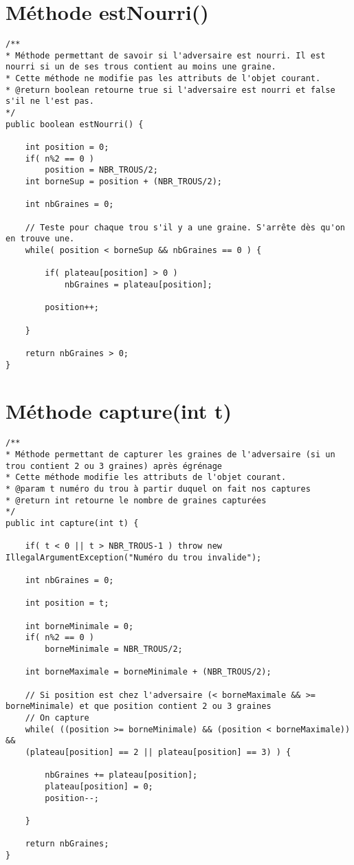 \documentclass[11pt,a4paper]{report}
\begin{document}
\newpage

\section{Méthode estNourri()}
\begin{lstlisting}
/**
* Méthode permettant de savoir si l'adversaire est nourri. Il est nourri si un de ses trous contient au moins une graine.
* Cette méthode ne modifie pas les attributs de l'objet courant.
* @return boolean retourne true si l'adversaire est nourri et false s'il ne l'est pas.
*/
public boolean estNourri() {

    int position = 0;
    if( n%2 == 0 ) 
        position = NBR_TROUS/2;
    int borneSup = position + (NBR_TROUS/2);

    int nbGraines = 0;

    // Teste pour chaque trou s'il y a une graine. S'arrête dès qu'on en trouve une.
    while( position < borneSup && nbGraines == 0 ) {

        if( plateau[position] > 0 )
            nbGraines = plateau[position];

        position++;

    }

    return nbGraines > 0;
}
\end{lstlisting}

\newpage

\section{Méthode capture(int t)}
\begin{lstlisting}
/**
* Méthode permettant de capturer les graines de l'adversaire (si un trou contient 2 ou 3 graines) après égrénage
* Cette méthode modifie les attributs de l'objet courant.
* @param t numéro du trou à partir duquel on fait nos captures
* @return int retourne le nombre de graines capturées
*/
public int capture(int t) {

    if( t < 0 || t > NBR_TROUS-1 ) throw new IllegalArgumentException("Numéro du trou invalide");

    int nbGraines = 0;

    int position = t;

    int borneMinimale = 0;
    if( n%2 == 0 )
        borneMinimale = NBR_TROUS/2;

    int borneMaximale = borneMinimale + (NBR_TROUS/2);
    
    // Si position est chez l'adversaire (< borneMaximale && >= borneMinimale) et que position contient 2 ou 3 graines
    // On capture
    while( ((position >= borneMinimale) && (position < borneMaximale)) && 
    (plateau[position] == 2 || plateau[position] == 3) ) {

        nbGraines += plateau[position];
        plateau[position] = 0;
        position--;

    }

    return nbGraines;
}
\end{lstlisting}
\end{document}
